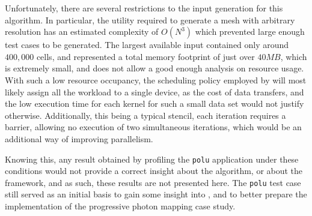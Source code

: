 \documentclass[main.tex]{subfiles}
\begin{document}
Unfortunately, there are several restrictions to the input generation for this algorithm. In particular, the utility required to generate a mesh with arbitrary resolution has an estimated complexity of $O(N^3)$ which prevented large enough test cases to be generated. The largest available input contained only around $400,000$ cells, and represented a total memory footprint of just over $40MB$, which is extremely small, and does not allow a good enough analysis on resource usage. With such a low resource occupancy, the scheduling policy employed by \gama will most likely assign all the workload to a single device, as the cost of data transfers, and the low execution time for each kernel for such a small data set would not justify otherwise. Additionally, this being a typical stencil, each iteration requires a barrier, allowing no execution of two simultaneous iterations, which would be an additional way of improving parallelism.

Knowing this, any result obtained by profiling the \texttt{polu} application under these conditions would not provide a correct insight about the algorithm, or about the framework, and as such, these results are not presented here.
The \texttt{polu} test case still served as an initial basis to gain some insight into \gama, and to better prepare the implementation of the progressive photon mapping case study.
\end{document}

